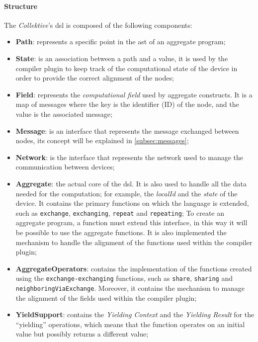 \paragraph{Structure}
The \emph{Collektive}'s \ac{dsl} is composed of the following components:
\begin{itemize}
    \item \textbf{Path}: represents a specific point in the \ac{ast} of an aggregate program;
    \item \textbf{State}: is an association between a path and a value, it is used by the compiler plugin to
        keep track of the computational state of the device in order to provide the correct alignment of the nodes;
    \item \textbf{Field}: represents the \emph{computational field} used by aggregate constructs.
        It is a map of messages where the key is the identifier (ID) of the node, and the value is the associated message;
    \item \textbf{Message}: is an interface that represents the message exchanged between nodes, its concept will be explained in \ref{subsec:messages};
    \item \textbf{Network}: is the interface that represents the network used to manage the communication between devices;
    \item \textbf{Aggregate}: the actual core of the \ac{dsl}.
        It is also used to handle all the data needed for the computation; for example, the \emph{localId} and the \emph{state} of the device.
        It contains the primary functions on which the language is extended, such as \texttt{exchange}, \texttt{exchanging}, \texttt{repeat} and \texttt{repeating};
        To create an aggregate program, a function must extend this interface, in this way it will be possible to use the aggregate functions.
        It is also implemented the mechanism to handle the alignment of the functions used within the compiler plugin;
    \item \textbf{AggregateOperators}: contains the implementation of the functions created using the \texttt{exchange-exchanging} functions,
        such as \texttt{share}, \texttt{sharing} and \texttt{neighboringViaExchange}.
        Moreover, it contains the mechanism to manage the alignment of the fields used within the compiler plugin;
    \item \textbf{YieldSupport}: contains the \emph{Yielding Context} and the \emph{Yielding Result} for the ``yielding''
        operations, which means that the function operates on an initial value but possibly returns a different value;

\end{itemize}
